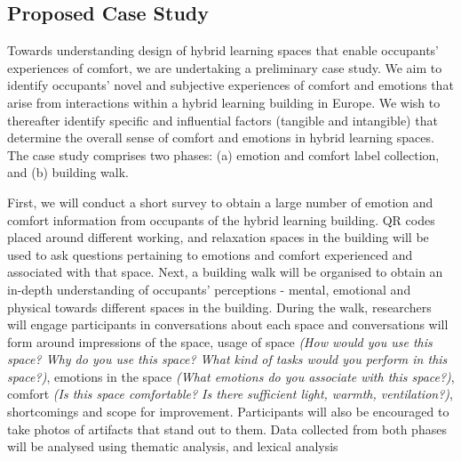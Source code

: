 \documentclass[acmconf, anonymous, review]{acmart}
\begin{document}
\subsection{Proposed Case Study} 
Towards understanding design of hybrid learning spaces that enable occupants' experiences of comfort, we are undertaking a preliminary case study. We aim to identify occupants' novel and subjective experiences of comfort and emotions that arise from interactions within a hybrid learning building in Europe. We wish to thereafter identify specific and influential factors (tangible and intangible) that determine the overall sense of comfort and emotions in hybrid learning spaces. The case study comprises two phases: (a) emotion and comfort label collection, and (b) building walk.

First, we will conduct a short survey to obtain a large number of emotion and comfort information from occupants of the hybrid learning building. QR codes placed around different working, and relaxation spaces in the building will be used to ask questions pertaining to emotions and comfort experienced and associated with that space. Next, a building walk will be organised to obtain an in-depth understanding of occupants' perceptions - mental, emotional and physical towards different spaces in the building. During the walk, researchers will engage participants in conversations about each space and conversations will form around impressions of the space, usage of space \textit{(How would you use this space? Why do you use this space? What kind of tasks would you perform in this space?)}, emotions in the space \textit{(What emotions do you associate with this space?)}, comfort \textit{(Is this space comfortable? Is there sufficient light, warmth, ventilation?)}, shortcomings and scope for improvement. Participants will also be encouraged to take photos of artifacts that stand out to them. Data collected from both phases will be analysed using thematic analysis, and lexical analysis \cite{braun2006using, xue2020mood}

\end{document}
